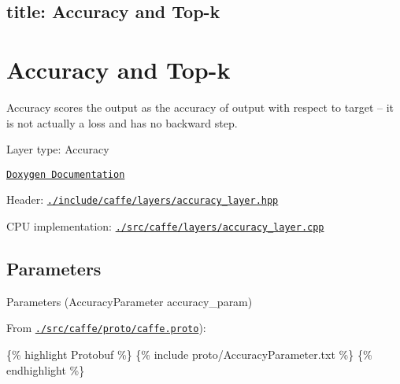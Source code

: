 

 \subsection*{title\+: Accuracy and Top-\/k }

\section*{Accuracy and Top-\/k}

{\ttfamily Accuracy} scores the output as the accuracy of output with respect to target -- it is not actually a loss and has no backward step.


\begin{DoxyItemize}
\item Layer type\+: {\ttfamily Accuracy}
\item \href{http://caffe.berkeleyvision.org/doxygen/classcaffe_1_1AccuracyLayer.html}{\tt Doxygen Documentation}
\item Header\+: \href{https://github.com/BVLC/caffe/blob/master/include/caffe/layers/accuracy_layer.hpp}{\tt {\ttfamily ./include/caffe/layers/accuracy\+\_\+layer.hpp}}
\item C\+PU implementation\+: \href{https://github.com/BVLC/caffe/blob/master/src/caffe/layers/accuracy_layer.cpp}{\tt {\ttfamily ./src/caffe/layers/accuracy\+\_\+layer.cpp}}
\end{DoxyItemize}

\subsection*{Parameters}


\begin{DoxyItemize}
\item Parameters ({\ttfamily Accuracy\+Parameter accuracy\+\_\+param})
\item From \href{https://github.com/BVLC/caffe/blob/master/src/caffe/proto/caffe.proto}{\tt {\ttfamily ./src/caffe/proto/caffe.proto}})\+:
\end{DoxyItemize}

\{\% highlight Protobuf \%\} \{\% include proto/\+Accuracy\+Parameter.\+txt \%\} \{\% endhighlight \%\} 